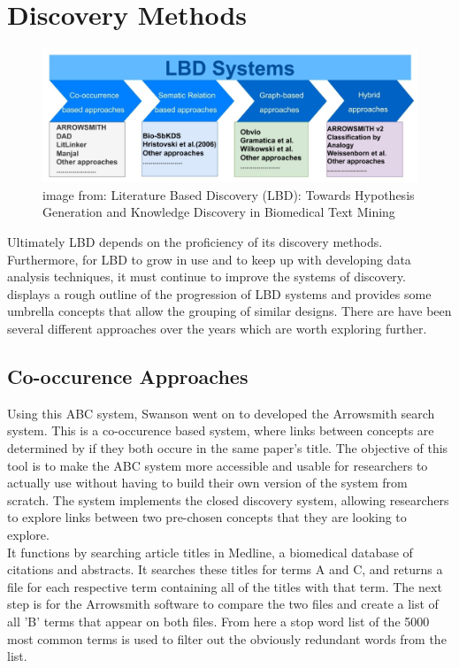 \documentclass{l4proj}
\begin{document}
\section{Discovery Methods}

\begin{figure}[h]
    \centering
    \includegraphics[width=\linewidth]{images/lbd_discovery_methods.png}
    \caption{image from: Literature Based Discovery (LBD): Towards Hypothesis Generation and Knowledge Discovery in Biomedical Text Mining}
    \label{fig:discovery_methods}
\end{figure}

Ultimately LBD depends on the proficiency of its discovery methods. Furthermore, for LBD to grow in use and to keep up with developing data analysis techniques, it must continue to improve the systems of discovery.  displays a rough outline of the progression of LBD systems and provides some umbrella concepts that allow the grouping of similar designs. There are have been several different approaches over the years which are worth exploring further. \\

\subsection{Co-occurence Approaches}

Using this ABC system, Swanson went on to developed the Arrowsmith search system. This is a co-occurence based system, where links between concepts are determined by if they both occure in the same paper's title. The objective of this tool is to make the ABC system more accessible and usable for researchers to actually use without having to build their own version of the system from scratch. The system implements the closed discovery system, allowing researchers to explore links between two pre-chosen concepts that they are looking to explore. \\

It functions by searching article titles in Medline, a biomedical database of citations and abstracts. It searches these titles for terms A and C, and returns a file for each respective term containing all of the titles with that term. The next step is for the Arrowsmith software to compare the two files and create a list of all 'B' terms that appear on both files. From here a stop word list of the 5000 most common terms is used to filter out the obviously redundant words from the list. \\
\end{document}
